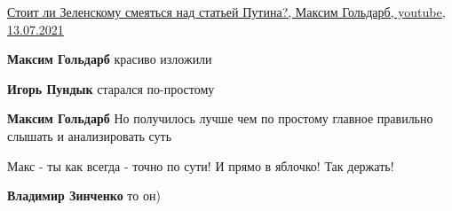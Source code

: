 \begin{itemize}
 

\href{https://youtu.be/QPLt871aTDE}{%
Стоит ли Зеленскому смеяться над статьей Путина?, Максим Гольдарб, youtube, 13.07.2021%
}

\begin{itemize}
 
\textbf{Максим Гольдарб} красиво изложили

 
\textbf{Игорь Пундык} старался по-простому

 
\textbf{Максим Гольдарб} Но получилось лучше чем по простому главное правильно слышать и анализировать суть
\end{itemize}

 
Макс - ты как всегда - точно по сути! И прямо в яблочко! Так держать!

\begin{itemize}
 
\textbf{Владимир Зинченко} то он)


\end{itemize}
\end{itemize}
